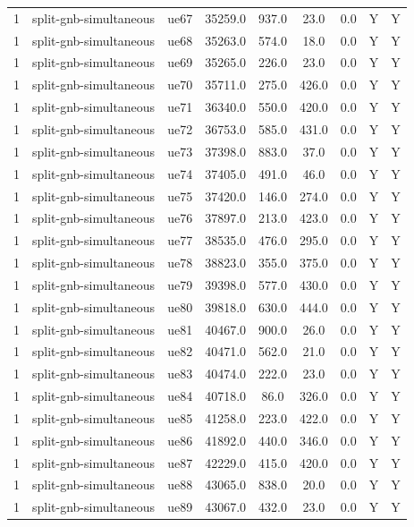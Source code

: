 \begin{table}[ht]
\begin{tabular}{|c|c|c|c|c|c|c|c|c|}
1 & split-gnb-simultaneous & ue67 & 35259.0 & 937.0 & 23.0 & 0.0 & Y & Y \\
1 & split-gnb-simultaneous & ue68 & 35263.0 & 574.0 & 18.0 & 0.0 & Y & Y \\
1 & split-gnb-simultaneous & ue69 & 35265.0 & 226.0 & 23.0 & 0.0 & Y & Y \\
1 & split-gnb-simultaneous & ue70 & 35711.0 & 275.0 & 426.0 & 0.0 & Y & Y \\
1 & split-gnb-simultaneous & ue71 & 36340.0 & 550.0 & 420.0 & 0.0 & Y & Y \\
1 & split-gnb-simultaneous & ue72 & 36753.0 & 585.0 & 431.0 & 0.0 & Y & Y \\
1 & split-gnb-simultaneous & ue73 & 37398.0 & 883.0 & 37.0 & 0.0 & Y & Y \\
1 & split-gnb-simultaneous & ue74 & 37405.0 & 491.0 & 46.0 & 0.0 & Y & Y \\
1 & split-gnb-simultaneous & ue75 & 37420.0 & 146.0 & 274.0 & 0.0 & Y & Y \\
1 & split-gnb-simultaneous & ue76 & 37897.0 & 213.0 & 423.0 & 0.0 & Y & Y \\
1 & split-gnb-simultaneous & ue77 & 38535.0 & 476.0 & 295.0 & 0.0 & Y & Y \\
1 & split-gnb-simultaneous & ue78 & 38823.0 & 355.0 & 375.0 & 0.0 & Y & Y \\
1 & split-gnb-simultaneous & ue79 & 39398.0 & 577.0 & 430.0 & 0.0 & Y & Y \\
1 & split-gnb-simultaneous & ue80 & 39818.0 & 630.0 & 444.0 & 0.0 & Y & Y \\
1 & split-gnb-simultaneous & ue81 & 40467.0 & 900.0 & 26.0 & 0.0 & Y & Y \\
1 & split-gnb-simultaneous & ue82 & 40471.0 & 562.0 & 21.0 & 0.0 & Y & Y \\
1 & split-gnb-simultaneous & ue83 & 40474.0 & 222.0 & 23.0 & 0.0 & Y & Y \\
1 & split-gnb-simultaneous & ue84 & 40718.0 & 86.0 & 326.0 & 0.0 & Y & Y \\
1 & split-gnb-simultaneous & ue85 & 41258.0 & 223.0 & 422.0 & 0.0 & Y & Y \\
1 & split-gnb-simultaneous & ue86 & 41892.0 & 440.0 & 346.0 & 0.0 & Y & Y \\
1 & split-gnb-simultaneous & ue87 & 42229.0 & 415.0 & 420.0 & 0.0 & Y & Y \\
1 & split-gnb-simultaneous & ue88 & 43065.0 & 838.0 & 20.0 & 0.0 & Y & Y \\
1 & split-gnb-simultaneous & ue89 & 43067.0 & 432.0 & 23.0 & 0.0 & Y & Y \\

\end{tabular}
\end{table}
